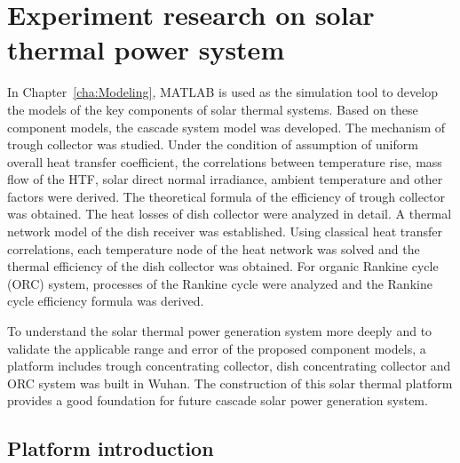 \chapter{Experiment research on solar thermal power system}

In Chapter~\ref{cha:Modeling}, MATLAB is used as the simulation tool to develop the models of the key components of solar thermal systems. Based on these component models, the cascade system model was developed.
The mechanism of trough collector was studied. Under the condition of assumption of uniform overall heat transfer coefficient, the correlations between temperature rise, mass flow of the HTF, solar direct normal irradiance, ambient temperature and other factors were derived. The theoretical formula of the efficiency of trough collector was obtained.
The heat losses of dish collector were analyzed in detail. A thermal network model of the dish receiver was established. Using classical heat transfer correlations, each temperature node of the heat network was solved and the thermal efficiency of the dish collector was obtained.
For organic Rankine cycle (ORC) system, processes of the Rankine cycle were analyzed and the Rankine cycle efficiency formula was derived.

To understand the solar thermal power generation system more deeply and to validate the applicable range and error of the proposed component models, a platform includes trough concentrating collector, dish concentrating collector and ORC system was built in Wuhan. The construction of this solar thermal platform provides a good foundation for future cascade solar power generation system.

\section{Platform introduction}

